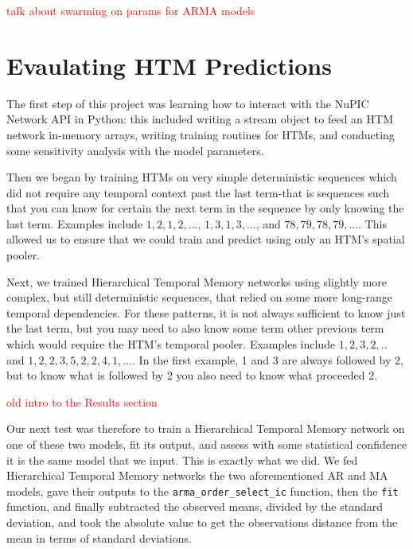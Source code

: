 \documentclass[oneside,12pt,openany]{book}
\begin{document}
	\textcolor{red}{talk about swarming on params for ARMA models}

    \vfill
    \pagebreak
    
    \section{Evaulating HTM Predictions}\label{sec:res:eval}
    
    The first step of this project was learning how to interact with the NuPIC Network API in Python: this included writing a stream object to feed an HTM network in-memory arrays, writing training routines for HTMs, and conducting some sensitivity analysis with the model parameters. 
    
    Then we began by training HTMs on very simple deterministic sequences which did not require any temporal context past the last term-that is sequences such that you can know for certain the next term in the sequence by only knowing the last term. Examples include $1,2,1,2,...$, $1,3,1,3,...$, and $78,79,78,79,...$. This allowed us to ensure that we could train and predict using only an HTM's spatial pooler.
    
    Next, we trained Hierarchical Temporal Memory networks using slightly more complex, but still deterministic sequences, that relied on some more long-range temporal dependencies. For these patterns, it is not always sufficient to know just the last term, but you may need to also know some term other previous term which would require the HTM's temporal pooler. Examples include $1,2,3,2,..$ and $1,2,2,3,5,2,2,4,1,...$. In the first example, 1 and 3 are always followed by 2, but to know what is followed by 2 you also need to know what proceeded 2.
    
    \textcolor{red}{old intro to the Results section }
	
	Our next test was therefore to train a Hierarchical Temporal Memory network on one of these two models, fit its output, and assess with some statistical confidence it is the same model that we input. This is exactly what we did. We fed Hierarchical Temporal Memory networks the two aforementioned AR and MA models, gave their outputs to the \texttt{arma\_order\_select\_ic} function, then the \texttt{fit} function, and finally subtracted the observed means, divided by the standard deviation, and took the absolute value to get the observations distance from the mean in terms of standard deviations. 
    
\end{document}
